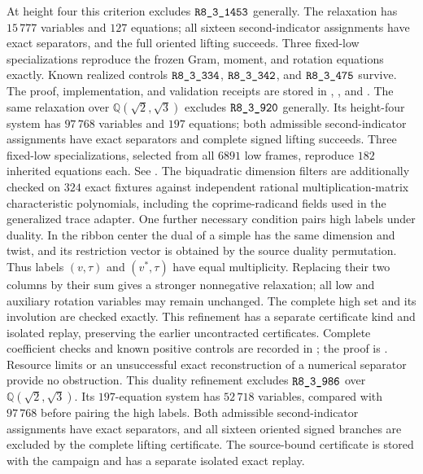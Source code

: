At height four this criterion excludes $\sha{R8_3_1453}$ generally. The
relaxation has $15\,777$ variables and $127$ equations; all sixteen
second-indicator assignments have exact separators, and the full oriented
lifting succeeds. Three fixed-low specializations reproduce the frozen
Gram, moment, and rotation equations exactly. Known realized controls
$\sha{R8_3_334}$, $\sha{R8_3_342}$, and $\sha{R8_3_475}$ survive. The proof,
implementation, and validation receipts are stored in
,
, and
.
The same relaxation over $\mathbb Q(\sqrt2,\sqrt3)$ excludes
$\sha{R8_3_920}$ generally.  Its height-four system has $97\,768$ variables
and $197$ equations; both admissible second-indicator assignments have
exact separators and complete signed lifting succeeds.  Three fixed-low
specializations, selected from all $6891$ low frames, reproduce $182$
inherited equations each.  See
.
The biquadratic dimension filters are additionally checked on $324$
exact fixtures against independent rational multiplication-matrix
characteristic polynomials, including the coprime-radicand fields used
in the generalized trace adapter.
One further necessary condition pairs high labels under duality.  In the
ribbon center the dual of a simple has the same dimension and twist, and
its restriction vector is obtained by the source duality permutation.
Thus labels $(v,\tau)$ and $(v^*,\tau)$ have equal multiplicity. Replacing
their two columns by their sum gives a stronger nonnegative relaxation;
all low and auxiliary rotation variables may remain unchanged. The
complete high set and its involution are checked exactly. This refinement
has a separate certificate kind and isolated replay, preserving the earlier
uncontracted certificates. Complete coefficient checks and known positive
controls are recorded in
; the proof is
. Resource limits or an unsuccessful
exact reconstruction of a numerical separator provide no obstruction.
This duality refinement excludes $\sha{R8_3_986}$ over
$\mathbb Q(\sqrt2,\sqrt3)$. Its $197$-equation system has $52\,718$
variables, compared with $97\,768$ before pairing the high labels. Both
admissible second-indicator assignments have exact separators, and all
sixteen oriented signed branches are excluded by the complete lifting
certificate. The source-bound certificate is stored with the
 campaign and has a separate isolated exact replay.
